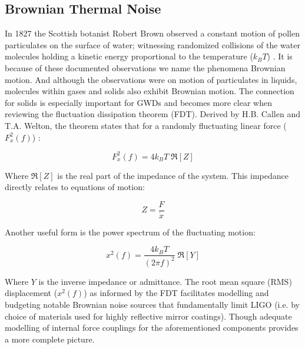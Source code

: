 \subsection{Brownian Thermal Noise}
In 1827 the Scottish botanist Robert Brown observed a constant motion of pollen particulates on the surface of water; witnessing randomized collisions of the water molecules holding a kinetic energy proportional to the temperature ($k_BT$) \cite{brown:1828}. It is because of these documented observations we name the phenomena Brownian motion. And although the observations were on motion of particulates in liquids, molecules within gases and solids also exhibit Brownian motion. The connection for solids is especially important for GWDs and becomes more clear when reviewing the fluctuation dissipation theorem (FDT). Derived by H.B. Callen and T.A. Welton, the theorem states that for a randomly fluctuating linear force ($F_x^2(f)$) \cite{callen:1951}:


\begin{equation}
F_x^2(f) = 4 k_B T\; \Re[Z]
\end{equation}

\noindent Where $\Re[Z]$ is the real part of the impedance of the system. This impedance directly relates to equations of motion:

 \begin{equation}
 Z = \frac{F}{\dot{x}}
 \end{equation}

 \noindent Another useful form is the power spectrum of the fluctuating motion:

\begin{equation}\label{eq:fdtpsd}
x^2 (f)  = \frac{4k_B T}{(2 \pi f)^2}\; \Re[Y]
\end{equation}

Where $Y$ is the inverse impedance or admittance. The root mean square (RMS) displacement ($x^2(f)$) as informed by the FDT facilitates modelling and budgeting notable Brownian noise sources that fundamentally limit LIGO (i.e. by choice of materials used for highly reflective mirror coatings). Though adequate modelling of internal force couplings for the aforementioned components provides a more complete picture.

